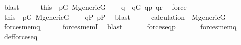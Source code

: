\begin{isabellebody}
\ blast\isanewline
\ \ \isamarkupfalse%
\ \isamarkupfalse%
\ this\ \ {\isacartoucheopen}p{\isasymin}G{\isacartoucheclose}\ {\isacartoucheopen}M{\isacharunderscore}{\kern0pt}generic{\isacharparenleft}{\kern0pt}G{\isacharparenright}{\kern0pt}{\isacartoucheclose}\isanewline
\ \ \isamarkupfalse%
\ q\ \ {\isachardoublequoteopen}q{\isasymin}G{\isachardoublequoteclose}\ {\isachardoublequoteopen}q{\isasympreceq}p{\isachardoublequoteclose}\ {\isachardoublequoteopen}q{\isasympreceq}r{\isachardoublequoteclose}\ \isamarkupfalse%
\ force\isanewline
\ \ \isamarkupfalse%
\ \isamarkupfalse%
\ this\ \ {\isacartoucheopen}p{\isasymin}G{\isacartoucheclose}\ {\isacartoucheopen}M{\isacharunderscore}{\kern0pt}generic{\isacharparenleft}{\kern0pt}G{\isacharparenright}{\kern0pt}{\isacartoucheclose}\isanewline
\ \ \isamarkupfalse%
\ {\isachardoublequoteopen}q{\isasymin}P{\isachardoublequoteclose}\ {\isachardoublequoteopen}p{\isasymin}P{\isachardoublequoteclose}\ \isamarkupfalse%
\ blast{\isacharplus}{\kern0pt}\isanewline
\ \ \isamarkupfalse%
\ \isamarkupfalse%
\ calculation\ \ {\isacartoucheopen}M{\isacharunderscore}{\kern0pt}generic{\isacharparenleft}{\kern0pt}G{\isacharparenright}{\kern0pt}{\isacartoucheclose}\isanewline
\ \ \isamarkupfalse%
\ {\isachardoublequoteopen}forces{\isacharunderscore}{\kern0pt}mem{\isacharparenleft}{\kern0pt}q{\isacharcomma}{\kern0pt}{\isasymsigma}{\isacharcomma}{\kern0pt}{\isasymtheta}{\isacharparenright}{\kern0pt}{\isachardoublequoteclose}\isanewline
\ \ \ \ \isamarkupfalse%
\ forces{\isacharunderscore}{\kern0pt}memI\ \isamarkupfalse%
\ blast\isanewline
\ \ \isamarkupfalse%
\isanewline
\ \ \isamarkupfalse%
\ {\isacartoucheopen}forces{\isacharunderscore}{\kern0pt}eq{\isacharparenleft}{\kern0pt}p{\isacharcomma}{\kern0pt}{\isasymtau}{\isacharcomma}{\kern0pt}{\isasymtheta}{\isacharparenright}{\kern0pt}{\isacartoucheclose}\isanewline
\ \ \isamarkupfalse%
\isanewline
\ \ \isamarkupfalse%
\ {\isachardoublequoteopen}forces{\isacharunderscore}{\kern0pt}mem{\isacharparenleft}{\kern0pt}q{\isacharcomma}{\kern0pt}{\isasymsigma}{\isacharcomma}{\kern0pt}{\isasymtau}{\isacharparenright}{\kern0pt}{\isachardoublequoteclose}\isanewline
\ \ \ \ \isamarkupfalse%
\ def{\isacharunderscore}{\kern0pt}forces{\isacharunderscore}{\kern0pt}eq\ \isamarkupfalse%

\end{isabellebody}

